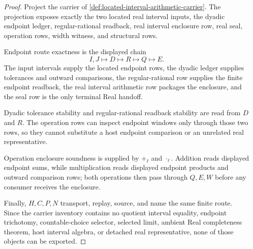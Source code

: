 \begin{proof}
Project the carrier of \autoref{def:located-interval-arithmetic-carrier}. The projection exposes exactly the two located real interval inputs, the dyadic endpoint ledger, regular-rational readback, real interval enclosure row, real seal, operation rows, width witness, and structural rows.

Endpoint route exactness is the displayed chain
$$
I,J \longmapsto D \longmapsto R \longmapsto Q \longmapsto E .
$$
The input intervals supply the located endpoint rows, the dyadic ledger supplies tolerances and outward comparisons, the regular-rational row supplies the finite endpoint readback, the real interval arithmetic row packages the enclosure, and the seal row is the only terminal Real handoff.

Dyadic tolerance stability and regular-rational readback stability are read from $D$ and $R$. The operation rows can inspect endpoint windows only through those two rows, so they cannot substitute a host endpoint comparison or an unrelated real representative.

Operation enclosure soundness is supplied by $+_\ell$ and $\cdot_\ell$. Addition reads displayed endpoint sums, while multiplication reads displayed endpoint products and outward comparison rows; both operations then pass through $Q,E,W$ before any consumer receives the enclosure.

Finally, $H,C,P,N$ transport, replay, source, and name the same finite route. Since the carrier inventory contains no quotient interval equality, endpoint trichotomy, countable-choice selector, selected limit, ambient Real completeness theorem, host interval algebra, or detached real representative, none of those objects can be exported.
\end{proof}

